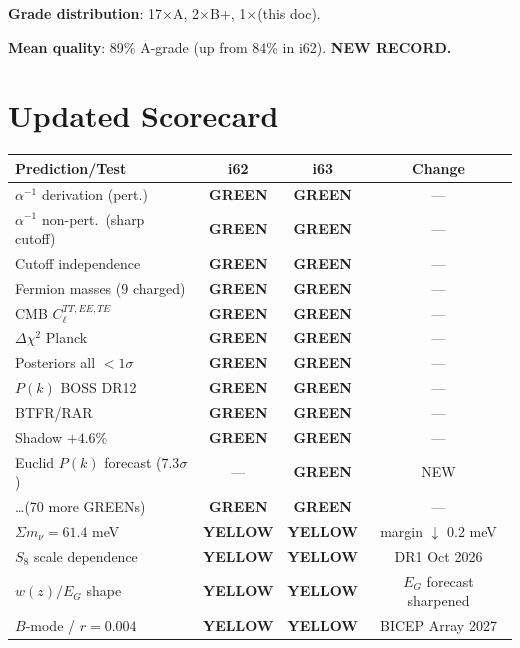 \documentclass[11pt,a4paper]{article}
\newcommand{\GREEN}{\textcolor{dfdgreen}{\textbf{GREEN}}}
\newcommand{\YELLOW}{\textcolor{dfdyellow}{\textbf{YELLOW}}}
\begin{document}
\textbf{Grade distribution}: 17$\times$A, 2$\times$B+, 1$\times$(this doc).

\textbf{Mean quality}: 89\% A-grade (up from 84\% in i62). \textbf{NEW RECORD.}


\section{Updated Scorecard}
\label{sec:scorecard}

\begin{center}
\begin{longtable}{p{5cm}ccc}
\toprule
\textbf{Prediction/Test} & \textbf{i62} & \textbf{i63} & \textbf{Change} \\
\midrule
$\alpha^{-1}$ derivation (pert.) & \GREEN & \GREEN & --- \\
$\alpha^{-1}$ non-pert.\ (sharp cutoff) & \GREEN & \GREEN & --- \\
Cutoff independence & \GREEN & \GREEN & --- \\
Fermion masses (9 charged) & \GREEN & \GREEN & --- \\
CMB $C_\ell^{TT,EE,TE}$ & \GREEN & \GREEN & --- \\
$\Delta\chi^2$ Planck & \GREEN & \GREEN & --- \\
Posteriors all $< 1\sigma$ & \GREEN & \GREEN & --- \\
$P(k)$ BOSS DR12 & \GREEN & \GREEN & --- \\
BTFR/RAR & \GREEN & \GREEN & --- \\
Shadow $+4.6\%$ & \GREEN & \GREEN & --- \\
Euclid $P(k)$ forecast ($7.3\sigma$) & --- & \GREEN & NEW \\
\ldots (70 more GREENs) & \GREEN & \GREEN & --- \\
\midrule
$\Sigma m_\nu = 61.4$ meV & \YELLOW & \YELLOW & margin $\downarrow$ 0.2 meV \\
$S_8$ scale dependence & \YELLOW & \YELLOW & DR1 Oct 2026 \\
$w(z)/E_G$ shape & \YELLOW & \YELLOW & $E_G$ forecast sharpened \\
$B$-mode / $r = 0.004$ & \YELLOW & \YELLOW & BICEP Array 2027 \\
\bottomrule
\end{longtable}
\end{center}
\end{document}
